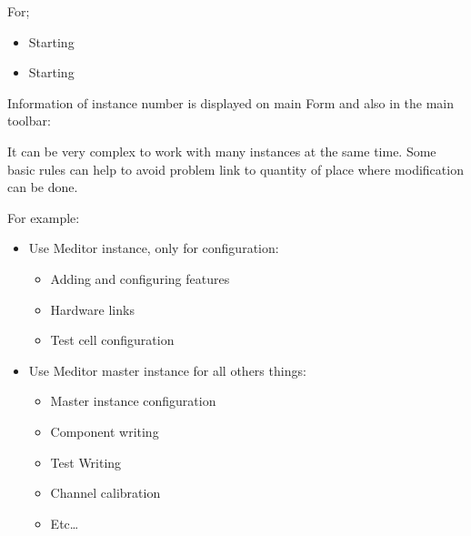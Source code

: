 \documentclass[letterpaper,10pt,english]{jupyterBook}
\begin{document}
\sphinxAtStartPar
{}

\sphinxAtStartPar
For;
\begin{itemize}
\item {} 
\sphinxAtStartPar
Starting 

\item {} 
\sphinxAtStartPar
Starting 

\end{itemize}

\sphinxAtStartPar
Information of instance number is displayed on main Form and also in the main toolbar: 

\sphinxAtStartPar
It can be very complex to work with many instances at the same time. Some basic rules can help to avoid problem link to quantity of place where modification can be done.

\sphinxAtStartPar
For example:
\begin{itemize}
\item {} 
\sphinxAtStartPar
Use Meditor instance, only for configuration:
\begin{itemize}
\item {} 
\sphinxAtStartPar
Adding and configuring features

\item {} 
\sphinxAtStartPar
Hardware links

\item {} 
\sphinxAtStartPar
Test cell configuration

\end{itemize}

\item {} 
\sphinxAtStartPar
Use Meditor master instance for all others things:
\begin{itemize}
\item {} 
\sphinxAtStartPar
Master instance configuration

\item {} 
\sphinxAtStartPar
Component writing

\item {} 
\sphinxAtStartPar
Test Writing

\item {} 
\sphinxAtStartPar
Channel calibration

\item {} 
\sphinxAtStartPar
Etc…

\end{itemize}

\end{itemize}
\end{document}
